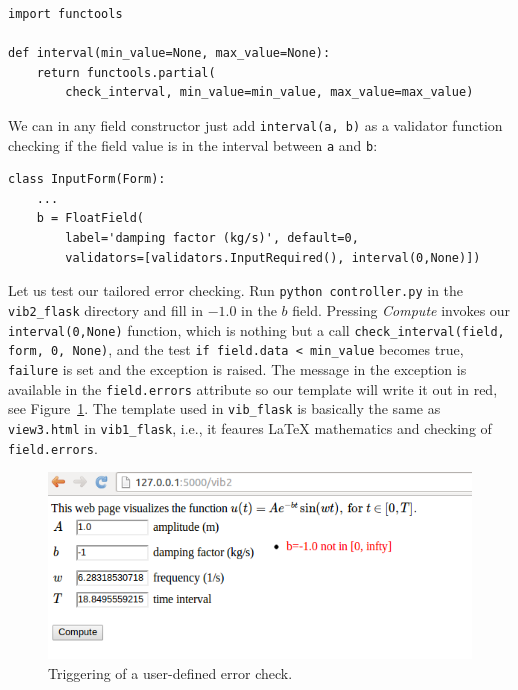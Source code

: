 \documentclass[%
oneside,                 %
final,                   %
10pt]{article}
\begin{document}
\begin{Verbatim}[numbers=none,fontsize=\fontsize{9pt}{9pt},baselinestretch=0.85]
import functools

def interval(min_value=None, max_value=None):
    return functools.partial(
        check_interval, min_value=min_value, max_value=max_value)
\end{Verbatim}
We can in any field constructor just add
\Verb!interval(a, b)! as a validator function checking if the field value is
in the interval between \Verb!a! and \Verb!b!:

\begin{Verbatim}[numbers=none,fontsize=\fontsize{9pt}{9pt},baselinestretch=0.85]
class InputForm(Form):
    ...
    b = FloatField(
        label='damping factor (kg/s)', default=0,
        validators=[validators.InputRequired(), interval(0,None)])
\end{Verbatim}

Let us test our tailored error checking. Run \Verb!python controller.py!
in the \Verb!vib2_flask! directory and fill in $-1.0$ in the $b$ field.
Pressing \emph{Compute} invokes our \Verb!interval(0,None)! function, which
is nothing but a call \Verb!check_interval(field, form, 0, None)!,
and the test \Verb!if field.data < min_value! becomes true, \Verb!failure!
is set and the exception is raised. The message in the exception
is available in the \Verb!field.errors! attribute so our template
will write it out in red, see Figure~\ref{wf:vib2:flask:fig:error1}.
The template used in \Verb!vib_flask! is basically the same as \Verb!view3.html!
in \Verb!vib1_flask!, i.e., it feaures {\LaTeX} mathematics and checking of
\Verb!field.errors!.


\begin{figure}[ht]
  \centerline{\includegraphics[width=0.9\linewidth]{fig-web4sa/vib2_flask_error1.png}}
  \caption{
  Triggering of a user-defined error check. \label{wf:vib2:flask:fig:error1}
  }
\end{figure}
\end{document}
